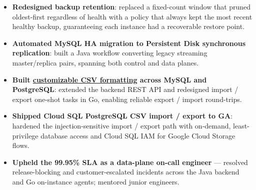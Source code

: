 \documentclass{resume-v2}
\begin{document}
\begin{itemize}
  \item \textbf{Redesigned backup retention}: replaced a fixed-count window that pruned oldest-first regardless of health with a policy that always kept the most recent healthy backup, guaranteeing each instance had a recoverable restore point.
  \item \textbf{Automated MySQL HA migration to Persistent Disk synchronous replication}: built a Java workflow converting legacy streaming master/replica pairs, spanning both control and data planes.
  \item \textbf{Built \href{https://cloud.google.com/sql/docs/postgres/import-export/import-export-csv}{customizable CSV formatting} across MySQL and PostgreSQL}: extended the backend REST API and redesigned import / export one-shot tasks in Go, enabling reliable export / import round-trips.
  \item \textbf{Shipped Cloud SQL PostgreSQL CSV import / export to GA}: hardened the injection-sensitive import / export path with on-demand, least-privilege database access and Cloud SQL IAM for Google Cloud Storage flows.
  \item \textbf{Upheld the 99.95\% SLA as a data-plane on-call engineer} --- resolved release-blocking and customer-escalated incidents across the Java backend and Go on-instance agents; mentored junior engineers.
\end{itemize}
\end{document}
